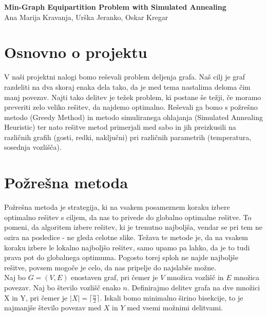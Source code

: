 \documentclass[12pt,a4paper]{amsart}
\theoremstyle{definition} %
\theoremstyle{plain} %
\newcommand{\naslovdela}{Min-Graph Equipartition Problem with Simulated Annealing}
\newcommand{\letnica}{2019}
\begin{document}
\thispagestyle{empty}
\vfill

\begin{center}{\large
{\bf \naslovdela}\\[10mm]
Ana Marija Kravanja, Urška Jeranko, Oskar Kregar}\\[1cm]

\end{center}
\vfill

\noindent{\large
Ljubljana, \letnica}
\pagebreak


\section{Osnovno o projektu}
V naši projektni nalogi bomo reševali problem deljenja grafa. Naš cilj je graf razdeliti na dva skoraj enaka dela tako, da je med tema nastalima deloma čim manj povezav. Najti tako delitev je težek problem, ki postane še težji, če moramo preveriti zelo veliko rešitev, da najdemo optimalno. Reševali ga bomo s požrešno metodo (Greedy Method) in metodo simuliranega ohlajanja (Simulated Annealing Heuristic) ter nato rešitve metod primerjali med sabo in jih preizkusili na različnih grafih (gosti, redki, naključni) pri različnih parametrih (temperatura, sosednja vozlišča). 

\section{Požrešna metoda}
Požrešna metoda je strategija, ki na vsakem posameznem koraku izbere optimalno rešitev s ciljem, da nas to privede do globalno optimalne rešitve. To pomeni, da algoritem izbere rešitev, ki je trenutno najboljša, vendar se pri tem ne ozira na posledice - ne gleda celotne slike. Težava te metode je, da na vsakem koraku izbere le lokalno najboljšo rešitev, samo upamo pa lahko, da je to tudi prava pot do globalnega optimuma. Pogosto torej sploh ne najde najboljše rešitve, povsem mogoče je celo, da nas pripelje do najslabše možne. \\

Naj bo $G=(V,E)$ enostaven graf, pri čemer je $V$ množica vozlišč in $E$ množica povezav. Naj bo število vozlišč enako $n$. Definirajmo delitev grafa na dve množici X in Y, pri čemer je $|X| = \lceil \frac{n}{2} \rceil$. Iskali bomo minimalno širino bisekcije, to je najmanjše število povezav med $X$ in $Y$ med vsemi možnimi delitvami.
\end{document}
